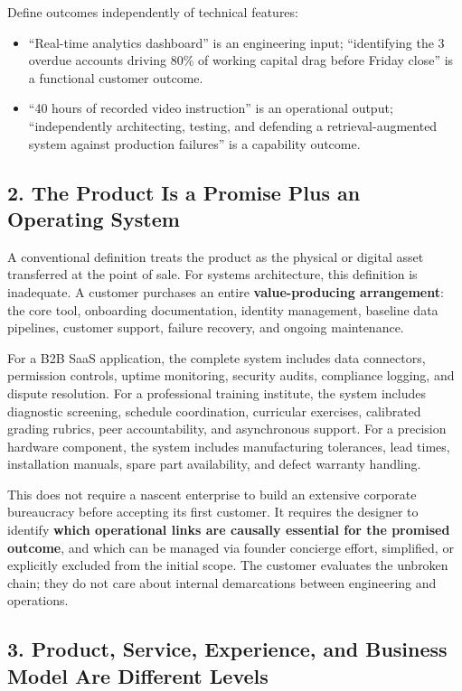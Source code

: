 Define outcomes independently of technical features:
\begin{itemize}
    \item ``Real-time analytics dashboard'' is an engineering input; ``identifying the 3 overdue accounts driving 80\% of working capital drag before Friday close'' is a functional customer outcome.
    \item ``40 hours of recorded video instruction'' is an operational output; ``independently architecting, testing, and defending a retrieval-augmented system against production failures'' is a capability outcome.
\end{itemize}

\subsection*{2. The Product Is a Promise Plus an Operating System}

A conventional definition treats the product as the physical or digital asset transferred at the point of sale. For systems architecture, this definition is inadequate. A customer purchases an entire \textbf{value-producing arrangement}: the core tool, onboarding documentation, identity management, baseline data pipelines, customer support, failure recovery, and ongoing maintenance.

For a B2B SaaS application, the complete system includes data connectors, permission controls, uptime monitoring, security audits, compliance logging, and dispute resolution. For a professional training institute, the system includes diagnostic screening, schedule coordination, curricular exercises, calibrated grading rubrics, peer accountability, and asynchronous support. For a precision hardware component, the system includes manufacturing tolerances, lead times, installation manuals, spare part availability, and defect warranty handling.

This does not require a nascent enterprise to build an extensive corporate bureaucracy before accepting its first customer. It requires the designer to identify \textbf{which operational links are causally essential for the promised outcome}, and which can be managed via founder concierge effort, simplified, or explicitly excluded from the initial scope. The customer evaluates the unbroken chain; they do not care about internal demarcations between engineering and operations.

\subsection*{3. Product, Service, Experience, and Business Model Are Different Levels}

